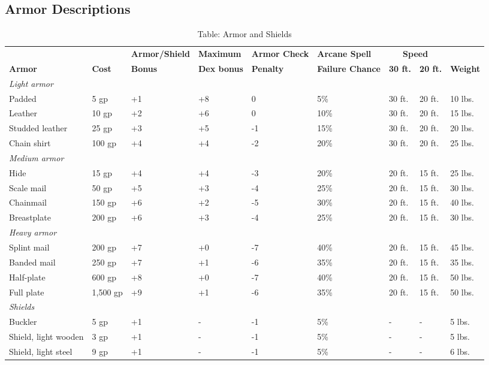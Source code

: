 \subsection{Armor Descriptions}

\begin{table*}[]
\sffamily
\setlength{\tabcolsep}{1pt}
\caption{Table: Armor and Shields}
\begin{tabular}{lllllllll}
                        &      & \textbf{Armor/Shield} & \textbf{Maximum} & \textbf{Armor Check} & \textbf{Arcane Spell} & \multicolumn{2}{c}{\textbf{Speed}} &  \\
\textbf{Armor} & \textbf{Cost} & \textbf{Bonus}        & \textbf{Dex bonus} & \textbf{Penalty}   & \textbf{Failure Chance} & \textbf{30 ft.} & \textbf{20 ft.} & \textbf{Weight}\\
\textit{Light armor} \\
 Padded& 5 gp& +1& +8& 0& 5\%& 30 ft.& 20 ft.& 10 lbs. \\
 Leather& 10 gp& +2& +6& 0& 10\%& 30 ft.& 20 ft.& 15 lbs. \\
 Studded leather& 25 gp& +3& +5& -1& 15\%& 30 ft.& 20 ft.& 20 lbs. \\
 Chain shirt& 100 gp& +4& +4& -2& 20\%& 30 ft.& 20 ft.& 25 lbs. \\
\textit{Medium armor}   \\
 Hide& 15 gp& +4& +4& -3& 20\%& 20 ft.& 15 ft.& 25 lbs. \\
 Scale mail& 50 gp& +5& +3& -4& 25\%& 20 ft.& 15 ft.& 30 lbs. \\
 Chainmail& 150 gp& +6& +2& -5& 30\%& 20 ft.& 15 ft.& 40 lbs. \\
 Breastplate& 200 gp& +6& +3& -4& 25\%& 20 ft.& 15 ft.& 30 lbs. \\
\textit{Heavy armor}   \\
 Splint mail& 200 gp& +7& +0& -7& 40\%& 20 ft.& 15 ft.& 45 lbs. \\
 Banded mail& 250 gp& +7& +1& -6& 35\%& 20 ft.& 15 ft.& 35 lbs. \\
 Half-plate& 600 gp& +8& +0& -7& 40\%& 20 ft.& 15 ft.& 50 lbs. \\
 Full plate& 1,500 gp& +9& +1& -6& 35\%& 20 ft.& 15 ft.& 50 lbs. \\
 \textit{Shields}   \\
 Buckler& 5 gp& +1& -& -1& 5\%& -& -& 5 lbs. \\
 Shield, light wooden& 3 gp& +1& -& -1& 5\%& -& -& 5 lbs. \\
 Shield, light steel& 9 gp& +1& -& -1& 5\%& -& -& 6 lbs. \\

\end{tabular}
\end{table*}
